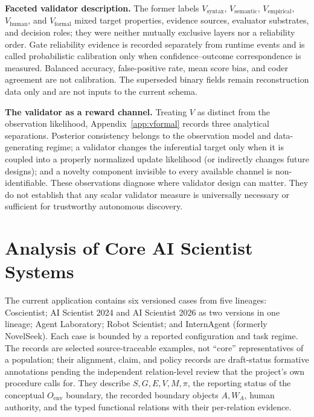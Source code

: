 \documentclass{article}
\begin{document}
\noindent\textbf{Faceted validator description.} The former labels $V_\text{syntax}$, $V_\text{semantic}$, $V_\text{empirical}$, $V_\text{human}$, and $V_\text{formal}$ mixed target properties, evidence sources, evaluator substrates, and decision roles; they were neither mutually exclusive layers nor a reliability order. Gate reliability evidence is recorded separately from runtime events and is called probabilistic calibration only when confidence--outcome correspondence is measured. Balanced accuracy, false-positive rate, mean score bias, and coder agreement are not calibration. The superseded binary fields remain reconstruction data only and are not inputs to the current schema.

\noindent\textbf{The validator as a reward channel.} Treating $V$ as distinct from the observation likelihood, Appendix~\ref{app:vformal} records three analytical separations. Posterior consistency belongs to the observation model and data-generating regime; a validator changes the inferential target only when it is coupled into a properly normalized update likelihood (or indirectly changes future designs); and a novelty component invisible to every available channel is non-identifiable. These observations diagnose where validator design can matter. They do not establish that any scalar validator measure is universally necessary or sufficient for trustworthy autonomous discovery.

\section{Analysis of Core AI Scientist Systems}
\label{sec:core}

The current application contains six versioned cases from five lineages: Coscientist; AI Scientist 2024 and AI Scientist 2026 as two versions in one lineage; Agent Laboratory; Robot Scientist; and InternAgent (formerly NovelSeek). Each case is bounded by a reported configuration and task regime. The records are selected source-traceable examples, not ``core'' representatives of a population; their alignment, claim, and policy records are draft-status formative annotations pending the independent relation-level review that the project's own procedure calls for. They describe $S,G,E,V,M,\pi$, the reporting status of the conceptual $O_{\mathrm{env}}$ boundary, the recorded boundary objects $A,W_A$, human authority, and the typed functional relations with their per-relation evidence.

\begin{table}[t]
\centering
\footnotesize

\caption{Six versioned cases from five lineages. IDs, versions, configurations, and task regimes are generated from the current Servo records.}
\label{tab:core-comparison}
\end{table}
\end{document}
